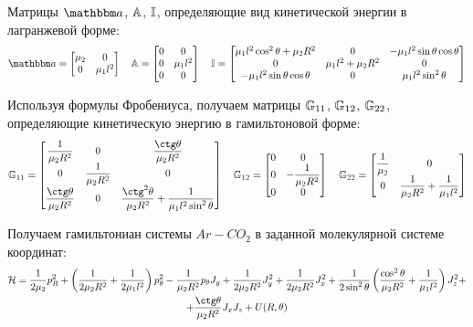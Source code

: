 Матрицы $\bba$, $\mathbb{A}$, $\mathbb{I}$, определяющие вид кинетической энергии в лагранжевой форме: 
\vverh
\begin{gather}
	\bba =
	\begin{bmatrix}
		\mu_2 & 0 \\
		0 & \mu_1 l^2
	\end{bmatrix} \quad 
	\bbA = 
	\begin{bmatrix}
		0 & 0 \\
		0 & \mu_1 l^2 \\
		0 & 0 
	\end{bmatrix} \quad
	\bbI = 
	\begin{bmatrix}
		\mu_1 l^2 \cos^2 \theta + \mu_2 R^2 & 0 & -\mu_1 l^2 \sin \theta \cos \theta \\
		0 & \mu_1 l^2 + \mu_2 R^2 & 0 \\
		- \mu_1 l^2 \sin \theta \cos \theta & 0 & \mu_1 l^2 \sin^2 \theta
	\end{bmatrix} \notag
\end{gather}

Используя формулы Фробениуса, получаем матрицы $\mathbb{G}_{11}$, $\mathbb{G}_{12}$, $\mathbb{G}_{22}$, определяющие кинетическую энергию в гамильтоновой форме:
\vverh
\begin{gather}
	\bbG_{11} =
	\begin{bmatrix}
		\dfrac{1}{\mu_2 R^2} & 0 & \dfrac{\ctg \theta}{\mu_2 R^2} \\
		0 & \dfrac{1}{\mu_2 R^2} & 0 \\
		\dfrac{\ctg \theta}{\mu_2 R^2} & 0 & \dfrac{\ctg^2 \theta}{\mu_2 R^2} + \dfrac{1}{\mu_1 l^2 \sin^2 \theta}
	\end{bmatrix} \quad
	\bbG_{12} =
	\begin{bmatrix}
		0 & 0 \\
		0 & - \dfrac{1}{\mu_2 R^2} \\
		0 & 0
	\end{bmatrix} \quad 
	\bbG_{22} = 
	\begin{bmatrix}
		\dfrac{1}{\mu_2} & 0 \\
		0 & \dfrac{1}{\mu_2 R^2} + \dfrac{1}{\mu_1 l^2}
	\end{bmatrix} \notag
\end{gather}

Получаем гамильтониан системы $Ar-CO_2$ в заданной молекулярной системе координат:
\begin{gather}
\mH = \frac{1}{2 \mu_2} p_R^2 + \lb \frac{1}{2 \mu_2 R^2} + \frac{1}{2 \mu_1 l^2} \rb p_\theta^2 - \frac{1}{\mu_2 R^2} p_\theta J_y + \frac{1}{2 \mu_2 R^2} J_y^2 + \frac{1}{2 \mu_2 R^2} J_x^2 + \frac{1}{2 \sin^2 \theta} \lb \frac{\cos^2 \theta}{\mu_2 R^2} + \frac{1}{\mu_1 l^2} \rb J_z^2 + \notag \\
+ \frac{\ctg \theta}{\mu_2 R^2} J_x J_z + U(R, \theta) \notag
\end{gather}



